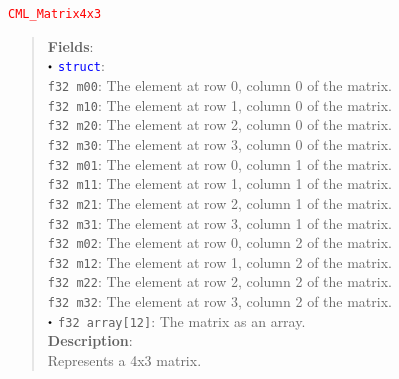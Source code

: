 \documentclass[a4paper,oneside,8pt]{extarticle}
\newcommand{\union}[1]{
  \noindent\textcolor{red}{\texttt{#1}}
  \vspace{-0.3em}
}
\renewcommand{\dot}{\raisebox{0.3ex}{\scalebox{0.6}{$\bullet$}}}
\theoremstyle{definition}
\begin{document}
\union{CML\_Matrix4x3}
\begin{quote}
  \textbf{Fields}: \\
  $\dot$ \textcolor{blue}{\texttt{struct}}: \\
  \indent\hspace{1em} \texttt{f32 m00}: The element at row 0, column 0 of the matrix. \\
  \indent\hspace{1em} \texttt{f32 m10}: The element at row 1, column 0 of the matrix. \\
  \indent\hspace{1em} \texttt{f32 m20}: The element at row 2, column 0 of the matrix. \\
  \indent\hspace{1em} \texttt{f32 m30}: The element at row 3, column 0 of the matrix. \\
  \indent\hspace{1em} \texttt{f32 m01}: The element at row 0, column 1 of the matrix. \\
  \indent\hspace{1em} \texttt{f32 m11}: The element at row 1, column 1 of the matrix. \\
  \indent\hspace{1em} \texttt{f32 m21}: The element at row 2, column 1 of the matrix. \\
  \indent\hspace{1em} \texttt{f32 m31}: The element at row 3, column 1 of the matrix. \\
  \indent\hspace{1em} \texttt{f32 m02}: The element at row 0, column 2 of the matrix. \\
  \indent\hspace{1em} \texttt{f32 m12}: The element at row 1, column 2 of the matrix. \\
  \indent\hspace{1em} \texttt{f32 m22}: The element at row 2, column 2 of the matrix. \\
  \indent\hspace{1em} \texttt{f32 m32}: The element at row 3, column 2 of the matrix. \\
  $\dot$ \texttt{f32 array[12]}: The matrix as an array. \\

  \vspace{-0.75em}
  \textbf{Description}: \\
  Represents a 4x3 matrix. \\
\end{quote}
\end{document}
